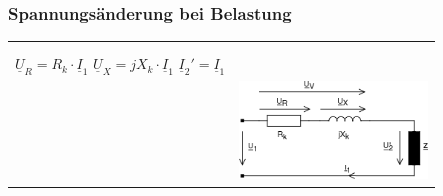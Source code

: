 		\subsubsection{Spannungs\"anderung bei Belastung}
			\begin{tabular}{p{10cm}p{6cm}}
            		\begin{minipage}{10cm}
	            		$\underline{U}_1 =
	            		\underline{U}_R+\underline{U}_X+\underline{U}_2'$ \qquad
	            		$\underline{U}_2'=\underline{U}_2 \cdot "u$\\ \\
	            		$\underline{U}_R=R_k \cdot \underline{I}_1$ \qquad
	            		$\underline{U}_X=jX_k \cdot \underline{I}_1$\qquad
	            		$\underline{I}_2' = \underline{I}_1$\\
	            		\end{minipage} &
            		\begin{minipage}{6cm}
	            		\includegraphics[width=5cm]{bilder/ErsatzschaltbildTrafoLast.png}
	            	\end{minipage}\\			
            \end{tabular}\\ \\

